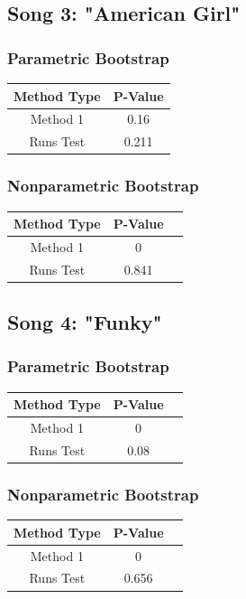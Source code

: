 \documentclass[12pt, letterpaper]{article}
\begin{document}
\subsection{Song 3: "American Girl"}
\subsubsection{Parametric Bootstrap}
\begin{tabular}{|c|c|}
\hline
\textbf{Method Type} & P-Value \\
\hline
Method 1 & 0.16 \\
\hline
Runs Test & 0.211 \\ 
\hline 
\end{tabular}

\subsubsection{Nonparametric Bootstrap}
\begin{tabular}{|c|c|c|}
\hline
\textbf{Method Type} & P-Value \\
\hline
Method 1 & 0  \\
\hline
Runs Test & 0.841 \\ 
\hline
\end{tabular}

\subsection{Song 4: "Funky"}
\subsubsection{Parametric Bootstrap}
\begin{tabular}{|c|c|c|}
\hline
\textbf{Method Type} & P-Value \\
\hline
Method 1 & 0 \\
\hline
Runs Test & 0.08  \\ 
\hline
\end{tabular}

\subsubsection{Nonparametric Bootstrap}
\begin{tabular}{|c|c|c|}
\hline
\textbf{Method Type} & P-Value \\
\hline
Method 1 & 0  \\
\hline
Runs Test & 0.656 \\ 
\hline
\end{tabular}
\end{document}
